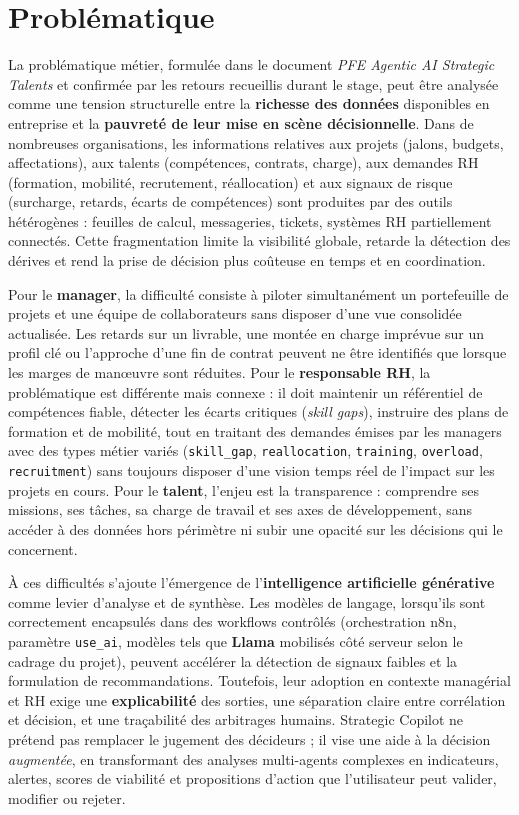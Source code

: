 \section{Problématique}

La problématique métier, formulée dans le document \emph{PFE Agentic AI Strategic Talents} et confirmée par les retours recueillis durant le stage, peut être analysée comme une tension structurelle entre la \textbf{richesse des données} disponibles en entreprise et la \textbf{pauvreté de leur mise en scène décisionnelle}. Dans de nombreuses organisations, les informations relatives aux projets (jalons, budgets, affectations), aux talents (compétences, contrats, charge), aux demandes RH (formation, mobilité, recrutement, réallocation) et aux signaux de risque (surcharge, retards, écarts de compétences) sont produites par des outils hétérogènes : feuilles de calcul, messageries, tickets, systèmes RH partiellement connectés. Cette fragmentation limite la visibilité globale, retarde la détection des dérives et rend la prise de décision plus coûteuse en temps et en coordination.

Pour le \textbf{manager}, la difficulté consiste à piloter simultanément un portefeuille de projets et une équipe de collaborateurs sans disposer d'une vue consolidée actualisée. Les retards sur un livrable, une montée en charge imprévue sur un profil clé ou l'approche d'une fin de contrat peuvent ne être identifiés que lorsque les marges de manœuvre sont réduites. Pour le \textbf{responsable RH}, la problématique est différente mais connexe : il doit maintenir un référentiel de compétences fiable, détecter les écarts critiques (\emph{skill gaps}), instruire des plans de formation et de mobilité, tout en traitant des demandes émises par les managers avec des types métier variés (\texttt{skill\_gap}, \texttt{reallocation}, \texttt{training}, \texttt{overload}, \texttt{recruitment}) sans toujours disposer d'une vision temps réel de l'impact sur les projets en cours. Pour le \textbf{talent}, l'enjeu est la transparence : comprendre ses missions, ses tâches, sa charge de travail et ses axes de développement, sans accéder à des données hors périmètre ni subir une opacité sur les décisions qui le concernent.

À ces difficultés s'ajoute l'émergence de l'\textbf{intelligence artificielle générative} comme levier d'analyse et de synthèse. Les modèles de langage, lorsqu'ils sont correctement encapsulés dans des workflows contrôlés (orchestration n8n, paramètre \texttt{use\_ai}, modèles tels que \textbf{Llama} mobilisés côté serveur selon le cadrage du projet), peuvent accélérer la détection de signaux faibles et la formulation de recommandations. Toutefois, leur adoption en contexte managérial et RH exige une \textbf{explicabilité} des sorties, une séparation claire entre corrélation et décision, et une traçabilité des arbitrages humains. Strategic Copilot ne prétend pas remplacer le jugement des décideurs ; il vise une aide à la décision \emph{augmentée}, en transformant des analyses multi-agents complexes en indicateurs, alertes, scores de viabilité et propositions d'action que l'utilisateur peut valider, modifier ou rejeter.

